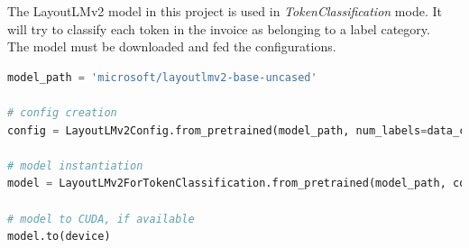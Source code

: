 The LayoutLMv2 model in this project is used in \emph{TokenClassification} mode. It will try
to classify each token in the invoice as belonging to a label category.\\
The model must be downloaded and fed the configurations.
\newpage
\begin{lstlisting}[language=python, label={lst:model_creation}, caption={Model Creation.}]
model_path = 'microsoft/layoutlmv2-base-uncased'

# config creation
config = LayoutLMv2Config.from_pretrained(model_path, num_labels=data_config.num_labels, id2label=data_config.id2label, label2id=data_config.label2id)

# model instantiation
model = LayoutLMv2ForTokenClassification.from_pretrained(model_path, config=config)

# model to CUDA, if available
model.to(device)
\end{lstlisting}

